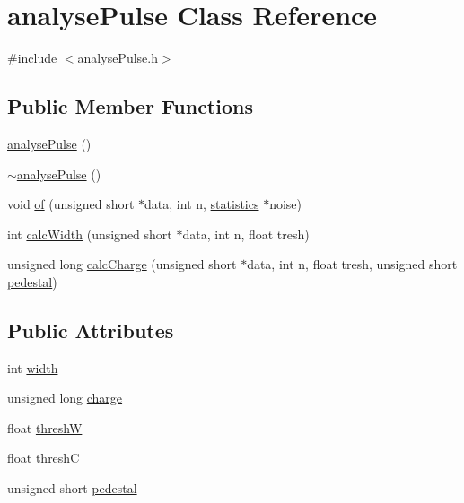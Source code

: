 \hypertarget{classanalysePulse}{\section{analyse\-Pulse Class Reference}
\label{classanalysePulse}
}


{\ttfamily \#include $<$analyse\-Pulse.\-h$>$}

\subsection*{Public Member Functions}
\begin{DoxyCompactItemize}
\item 
\hyperlink{classanalysePulse_a1bf652998a16d82e894e2a3f84c8d915}{analyse\-Pulse} ()
\item 
\hyperlink{classanalysePulse_ab0fa6bcbb1a94a94181fbffd1337735d}{$\sim$analyse\-Pulse} ()
\item 
void \hyperlink{classanalysePulse_a55294518533cc48e1fb4f3d75e83b1a9}{of} (unsigned short $\ast$data, int n, \hyperlink{classstatistics}{statistics} $\ast$noise)
\item 
int \hyperlink{classanalysePulse_a47d679dc1217690d20831a01ee0b8f58}{calc\-Width} (unsigned short $\ast$data, int n, float tresh)
\item 
unsigned long \hyperlink{classanalysePulse_a8a0f16ccc6afb387fd8f1642a90124a7}{calc\-Charge} (unsigned short $\ast$data, int n, float tresh, unsigned short \hyperlink{classanalysePulse_a9f10e08873da12460e9df17c2052bb7f}{pedestal})
\end{DoxyCompactItemize}
\subsection*{Public Attributes}
\begin{DoxyCompactItemize}
\item 
int \hyperlink{classanalysePulse_a221394fcd9acca79d2239e0303f5fddb}{width}
\item 
unsigned long \hyperlink{classanalysePulse_a627c195d98e2a9df7329eceddb1f9b8a}{charge}
\item 
float \hyperlink{classanalysePulse_a6770c0e1c7f266f52f9ca2bb9f60e78f}{thresh\-W}
\item 
float \hyperlink{classanalysePulse_a13a79360ba44937070cdabeeed8d9a30}{thresh\-C}
\item 
unsigned short \hyperlink{classanalysePulse_a9f10e08873da12460e9df17c2052bb7f}{pedestal}
\end{DoxyCompactItemize}


